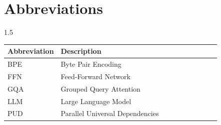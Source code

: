 \chapter*{Abbreviations}

\begin{spacing}{1.5}
\begin{longtable}{>{\raggedright\arraybackslash}p{0.25\linewidth}>{\raggedright\arraybackslash}p{0.75\linewidth}}
    \textbf{Abbreviation} & \textbf{Description} \\
    \hline
    BPE & Byte Pair Encoding \\
    FFN & Feed-Forward Network \\
    GQA & Grouped Query Attention \\
    LLM & Large Language Model \\
    PUD & Parallel Universal Dependencies \\
\end{longtable}
\end{spacing}




